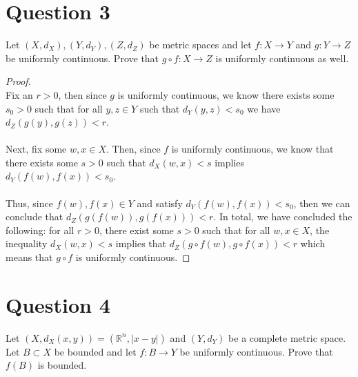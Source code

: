 \documentclass[10pt,a4paper]{article}
\theoremstyle{definition}
\theoremstyle{definition}
\numberwithin{equation}{section}
\begin{document}
\section*{Question 3}
Let $(X, d_X), (Y, d_Y), (Z, d_Z)$ be metric spaces and let $f: X \to Y$ and $g: Y \to Z$ be uniformly continuous. Prove that $g \circ f: X \to Z$ is uniformly continuous as well. 

\begin{proof}$ $
\\Fix an $r > 0$, then since $g$ is uniformly continuous, we know there exists some $s_0 > 0$ such that for all $y, z \in Y$ such that $d_Y(y, z) < s_0$ we have $d_Z(g(y), g(z)) < r$. 
\\
\\Next, fix some $w, x \in X$. Then, since $f$ is uniformly continuous, we know that there exists some $s > 0$ such that $d_X(w, x) < s$ implies $d_Y(f(w), f(x)) < s_0$. 
\\
\\Thus, since $f(w), f(x) \in Y$ and satisfy $d_Y(f(w), f(x)) < s_0$, then we can conclude that $d_Z(g(f(w)), g(f(x))) < r$. In total, we have concluded the following: for all $r > 0$, there exist some $s > 0$ such that for all $w, x \in X$, the inequality $d_X(w, x) < s$ implies that $d_Z(g \circ f(w), g \circ f(x)) < r$ which means that $g \circ f$ is uniformly continuous. 
\end{proof}

\section*{Question 4}
Let $(X, d_X(x, y)) = (\mathbb{R}^n, |x - y|)$ and $(Y, d_Y)$ be a complete metric space. Let $B \subset X$ be bounded and let $f: B \to Y$ be uniformly continuous. Prove that $f(B)$ is bounded. 
\end{document}
